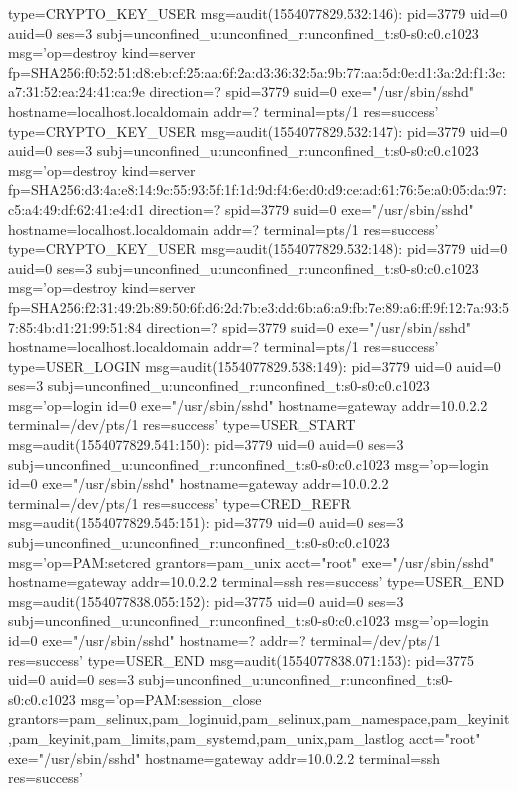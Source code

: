 \documentclass[]{report}
\newenvironment{Shaded}{}{}
\newcommand{\NormalTok}[1]{#1}
\begin{document}
\begin{Shaded}
\begin{Highlighting}[]
\NormalTok{type=CRYPTO_KEY_USER msg=audit(1554077829.532:146): pid=3779 uid=0 auid=0 ses=3 subj=unconfined_u:unconfined_r:unconfined_t:s0-s0:c0.c1023 msg='op=destroy kind=server fp=SHA256:f0:52:51:d8:eb:cf:25:aa:6f:2a:d3:36:32:5a:9b:77:aa:5d:0e:d1:3a:2d:f1:3c:a7:31:52:ea:24:41:ca:9e direction=? spid=3779 suid=0  exe="/usr/sbin/sshd" hostname=localhost.localdomain addr=? terminal=pts/1 res=success'}
\NormalTok{type=CRYPTO_KEY_USER msg=audit(1554077829.532:147): pid=3779 uid=0 auid=0 ses=3 subj=unconfined_u:unconfined_r:unconfined_t:s0-s0:c0.c1023 msg='op=destroy kind=server fp=SHA256:d3:4a:e8:14:9c:55:93:5f:1f:1d:9d:f4:6e:d0:d9:ce:ad:61:76:5e:a0:05:da:97:c5:a4:49:df:62:41:e4:d1 direction=? spid=3779 suid=0  exe="/usr/sbin/sshd" hostname=localhost.localdomain addr=? terminal=pts/1 res=success'}
\NormalTok{type=CRYPTO_KEY_USER msg=audit(1554077829.532:148): pid=3779 uid=0 auid=0 ses=3 subj=unconfined_u:unconfined_r:unconfined_t:s0-s0:c0.c1023 msg='op=destroy kind=server fp=SHA256:f2:31:49:2b:89:50:6f:d6:2d:7b:e3:dd:6b:a6:a9:fb:7e:89:a6:ff:9f:12:7a:93:57:85:4b:d1:21:99:51:84 direction=? spid=3779 suid=0  exe="/usr/sbin/sshd" hostname=localhost.localdomain addr=? terminal=pts/1 res=success'}
\NormalTok{type=USER_LOGIN msg=audit(1554077829.538:149): pid=3779 uid=0 auid=0 ses=3 subj=unconfined_u:unconfined_r:unconfined_t:s0-s0:c0.c1023 msg='op=login id=0 exe="/usr/sbin/sshd" hostname=gateway addr=10.0.2.2 terminal=/dev/pts/1 res=success'}
\NormalTok{type=USER_START msg=audit(1554077829.541:150): pid=3779 uid=0 auid=0 ses=3 subj=unconfined_u:unconfined_r:unconfined_t:s0-s0:c0.c1023 msg='op=login id=0 exe="/usr/sbin/sshd" hostname=gateway addr=10.0.2.2 terminal=/dev/pts/1 res=success'}
\NormalTok{type=CRED_REFR msg=audit(1554077829.545:151): pid=3779 uid=0 auid=0 ses=3 subj=unconfined_u:unconfined_r:unconfined_t:s0-s0:c0.c1023 msg='op=PAM:setcred grantors=pam_unix acct="root" exe="/usr/sbin/sshd" hostname=gateway addr=10.0.2.2 terminal=ssh res=success'}
\NormalTok{type=USER_END msg=audit(1554077838.055:152): pid=3775 uid=0 auid=0 ses=3 subj=unconfined_u:unconfined_r:unconfined_t:s0-s0:c0.c1023 msg='op=login id=0 exe="/usr/sbin/sshd" hostname=? addr=? terminal=/dev/pts/1 res=success'}
\NormalTok{type=USER_END msg=audit(1554077838.071:153): pid=3775 uid=0 auid=0 ses=3 subj=unconfined_u:unconfined_r:unconfined_t:s0-s0:c0.c1023 msg='op=PAM:session_close grantors=pam_selinux,pam_loginuid,pam_selinux,pam_namespace,pam_keyinit,pam_keyinit,pam_limits,pam_systemd,pam_unix,pam_lastlog acct="root" exe="/usr/sbin/sshd" hostname=gateway addr=10.0.2.2 terminal=ssh res=success'}

\end{Highlighting}
\end{Shaded}
\end{document}
